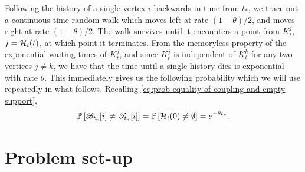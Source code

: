 	Following the history of a single vertex $i$ backwards in time from $t_*$, we trace out a continuous-time random walk which moves left at rate $(1 - \theta)/2$, and moves right at rate $(1 - \theta)/2$. The walk survives until it encounters a point from $K_t^j$, $j = \mathcal{H}_i(t)$, at which point it terminates. From the memoryless property of the exponential waiting times of $K_t^j$, and since $K_t^j$ is independent of $K_t^k$ for any two vertices $j \neq k$, we have that the time until a single history dies is exponential with rate $\theta$.
	This immediately gives us the following probability which we will use repeatedly in what follows. Recalling \eqref{eq:prob equality of coupling and empty support},
	\begin{equation}
		\mathbb{P} \left[ \mathscr{B}_{t_*}[i] \neq \mathscr{T}_{t_*}[i] \right] = 
		\mathbb{P} \left[ \mathcal{H}_i(0) \neq \emptyset \right] = 
		e^{-\theta t_*}.
		\label{eq:1D bernoulli prob}
	\end{equation}

	\section{Problem set-up}
	\label{sec:1D problem setup}



